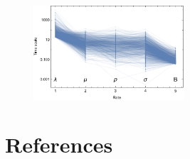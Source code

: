 \documentclass[12pt,english]{article}
\begin{document}
\begin{spacing}{1.9}
  \begin{figure}[h]
 	\centering
 	\includegraphics[width=0.5\textwidth]{fig_TS.pdf}
 	\caption{
 	}
 	\label{Hopfb}
 \end{figure}
 
%
%
%
%
%

\newpage

\section*{References}



\end{spacing}
\end{document}
